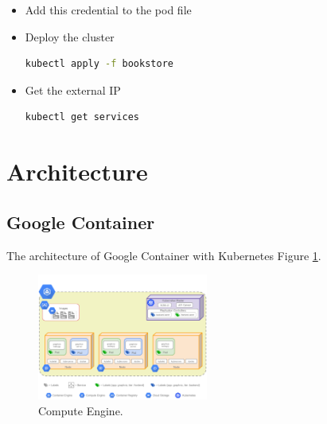 \documentclass[a4paper]{article}
\begin{document}
\begin{itemize}
\item Add this credential to the pod file \cite{containersql}
\item Deploy the cluster
\begin{lstlisting}[language=bash]
kubectl apply -f bookstore
\end{lstlisting}

\item Get the external IP
\begin{lstlisting}[language=bash]
kubectl get services
\end{lstlisting}

\end{itemize}


\section{Architecture}
\subsection{Google Container}
The architecture of Google Container with Kubernetes Figure \ref{fig:computeengine}.

\begin{figure}[!h]
\centering
\includegraphics[width=0.5\textwidth]{grapheComputeEngine.png}
\caption{\label{fig:computeengine}Compute Engine.\cite{omerdawelbeit}}
\end{figure}
\end{document}
